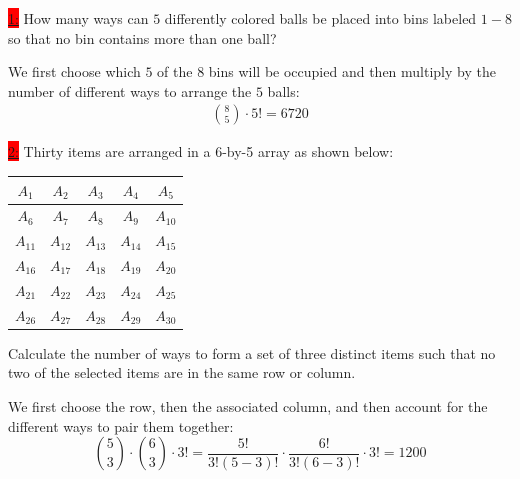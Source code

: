 \documentclass{exam}
\begin{document}
\colorbox{red}{\underline{1:}} How many ways can $5$ differently colored balls be placed into bins labeled $1 - 8$ so that no bin contains more than one ball?
\begin{solution}
    We first choose which $5$ of the $8$ bins will be occupied and then multiply by the number of different ways to arrange the $5$ balls:
    \begin{align*}
        \binom{8}{5} \cdot 5! = \boxed{6720}
    \end{align*}
\end{solution}

\colorbox{red}{\underline{2:}}
Thirty items are arranged in a 6-by-5 array as shown below:

\begin{center}
\begin{tabular}{|c|c|c|c|c|}
\hline
$A_1$  & $A_2$  & $A_3$  & $A_4$  & $A_5$  \\ \hline
$A_6$  & $A_7$  & $A_8$  & $A_9$  & $A_{10}$ \\ \hline
$A_{11}$ & $A_{12}$ & $A_{13}$ & $A_{14}$ & $A_{15}$ \\ \hline
$A_{16}$ & $A_{17}$ & $A_{18}$ & $A_{19}$ & $A_{20}$ \\ \hline
$A_{21}$ & $A_{22}$ & $A_{23}$ & $A_{24}$ & $A_{25}$ \\ \hline
$A_{26}$ & $A_{27}$ & $A_{28}$ & $A_{29}$ & $A_{30}$ \\ \hline
\end{tabular}
\end{center}

Calculate the number of ways to form a set of three distinct items such that no two of the selected items are in the same row or column.
\begin{solution}
    We first choose the row, then the associated column, and then account for the different ways to pair them together:
    \[
        \binom{5}{3} \cdot \binom{6}{3} \cdot 3! = \frac{5!}{3!(5-3)!} \cdot \frac{6!}{3!(6-3)!} \cdot 3! = \boxed{1200}  
    \]
\end{solution}

\end{document}
